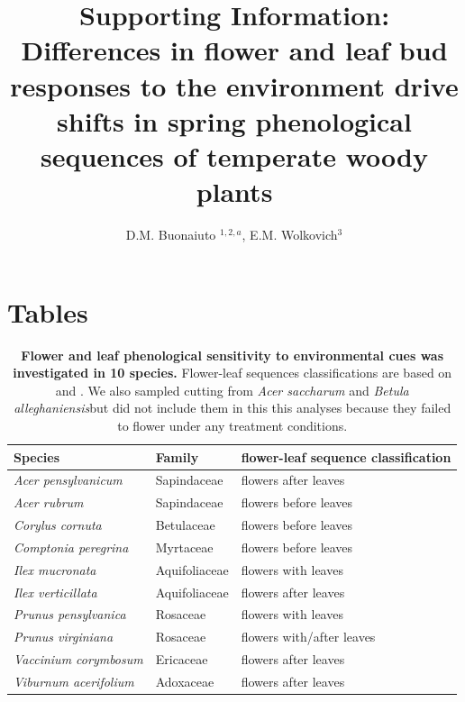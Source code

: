 \documentclass[11pt]{article}
\title{Supporting Information: Differences in flower and leaf bud responses to the environment drive shifts in spring phenological sequences of temperate woody plants}
\date{}
\author{D.M. Buonaiuto $^{1,2,a}$, E.M. Wolkovich$^{3}$}
\begin{document}
\maketitle

\section*{Tables}
\begin{table}[!ht]
\centering
\begin{tabular}{lll}
  \hline
  Species & Family  & flower-leaf sequence classification  \\ 
  \hline
  \textit{Acer pensylvanicum}& Sapindaceae & flowers after leaves\\
  \textit{Acer rubrum}& Sapindaceae & flowers before leaves\\
  \textit{Corylus cornuta}& Betulaceae & flowers before leaves\\
  \textit{Comptonia peregrina}& Myrtaceae & flowers before leaves\\
  \textit{Ilex mucronata} & Aquifoliaceae & flowers with leaves\\
   \textit{Ilex verticillata} & Aquifoliaceae & flowers after leaves\\
   \textit{Prunus pensylvanica} & Rosaceae & flowers with leaves\\
   \textit{Prunus virginiana} & Rosaceae & flowers with/after leaves\\
   \textit{Vaccinium corymbosum} & Ericaceae & flowers after leaves\\
   \textit{Viburnum acerifolium} & Adoxaceae & flowers after leaves\\
   \hline
\end{tabular}
\caption{\textbf{Flower and leaf phenological sensitivity to environmental cues was investigated in 10 species.} Flower-leaf sequences classifications are based on \citet{Barnes2004} and \citet{Barnes2016}. We also sampled cutting from \textit{Acer saccharum} and \textit{Betula alleghaniensis}but did not include them in this this analyses because they failed to flower under any treatment conditions.}
\label{tab:splist}
\end{table}
\end{document}
